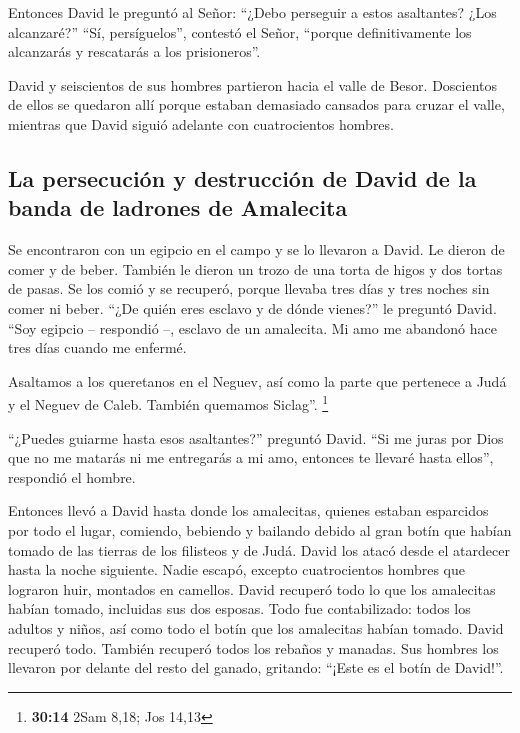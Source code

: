  Entonces David le preguntó al Señor: ``¿Debo perseguir a
estos asaltantes? ¿Los alcanzaré?'' ``Sí, persíguelos'', contestó el
Señor, ``porque definitivamente los alcanzarás y rescatarás a los
prisioneros''.

 David y seiscientos de sus hombres partieron hacia el
valle de Besor.  Doscientos de ellos se quedaron allí
porque estaban demasiado cansados para cruzar el valle, mientras que
David siguió adelante con cuatrocientos hombres.

\hypertarget{la-persecuciuxf3n-y-destrucciuxf3n-de-david-de-la-banda-de-ladrones-de-amalecita}{%
\subsection{La persecución y destrucción de David de la banda de
ladrones de
Amalecita}\label{la-persecuciuxf3n-y-destrucciuxf3n-de-david-de-la-banda-de-ladrones-de-amalecita}}

 Se encontraron con un egipcio en el campo y se lo
llevaron a David. Le dieron de comer y de beber.  También
le dieron un trozo de una torta de higos y dos tortas de pasas. Se los
comió y se recuperó, porque llevaba tres días y tres noches sin comer ni
beber.  ``¿De quién eres esclavo y de dónde vienes?'' le
preguntó David. ``Soy egipcio -- respondió --, esclavo de un amalecita.
Mi amo me abandonó hace tres días cuando me enfermé.

 Asaltamos a los queretanos en el Neguev, así como la
parte que pertenece a Judá y el Neguev de Caleb. También quemamos
Siclag''. \footnote{\textbf{30:14} 2Sam 8,18; Jos 14,13}

 ``¿Puedes guiarme hasta esos asaltantes?'' preguntó
David. ``Si me juras por Dios que no me matarás ni me entregarás a mi
amo, entonces te llevaré hasta ellos'', respondió el hombre.

 Entonces llevó a David hasta donde los amalecitas,
quienes estaban esparcidos por todo el lugar, comiendo, bebiendo y
bailando debido al gran botín que habían tomado de las tierras de los
filisteos y de Judá.  David los atacó desde el atardecer
hasta la noche siguiente. Nadie escapó, excepto cuatrocientos hombres
que lograron huir, montados en camellos.  David recuperó
todo lo que los amalecitas habían tomado, incluidas sus dos esposas.
 Todo fue contabilizado: todos los adultos y niños, así
como todo el botín que los amalecitas habían tomado. David recuperó
todo.  También recuperó todos los rebaños y manadas. Sus
hombres los llevaron por delante del resto del ganado, gritando: ``¡Este
es el botín de David!''.

